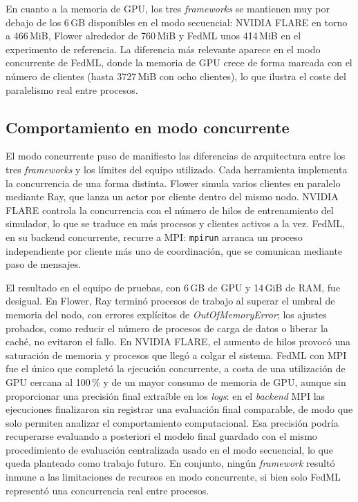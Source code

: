 En cuanto a la memoria de GPU, los tres \textit{frameworks} se mantienen muy por debajo de los
6\,GB disponibles en el modo secuencial: NVIDIA FLARE en torno a 466\,MiB, Flower alrededor de
760\,MiB y FedML unos 414\,MiB en el experimento de referencia. La diferencia más relevante
aparece en el modo concurrente de FedML, donde la memoria de GPU crece de forma marcada con el
número de clientes (hasta 3727\,MiB con ocho clientes), lo que ilustra el coste del paralelismo
real entre procesos.

\subsection{Comportamiento en modo concurrente}\label{sec:concurrencia}

El modo concurrente puso de manifiesto las diferencias de arquitectura entre los tres
\textit{frameworks} y los límites del equipo utilizado. Cada herramienta implementa la
concurrencia de una forma distinta. Flower simula varios clientes en paralelo mediante Ray, que
lanza un actor por cliente dentro del mismo nodo. NVIDIA FLARE controla la concurrencia con el
número de hilos de entrenamiento del simulador, lo que se traduce en más procesos y clientes
activos a la vez. FedML, en su backend concurrente, recurre a MPI: \texttt{mpirun} arranca un
proceso independiente por cliente más uno de coordinación, que se comunican mediante paso de
mensajes.

El resultado en el equipo de pruebas, con 6\,GB de GPU y 14\,GiB de RAM, fue desigual. En Flower,
Ray terminó procesos de trabajo al superar el umbral de memoria del nodo, con errores explícitos
de \textit{OutOfMemoryError}; los ajustes probados, como reducir el número de procesos de carga
de datos o liberar la caché, no evitaron el fallo. En NVIDIA FLARE, el aumento de hilos provocó
una saturación de memoria y procesos que llegó a colgar el sistema. FedML con MPI fue el único
que completó la ejecución concurrente, a costa de una utilización de GPU cercana al 100\,\% y de
un mayor consumo de memoria de GPU, aunque sin proporcionar una precisión final extraíble en los
\textit{logs}: en el \textit{backend} MPI las ejecuciones finalizaron sin registrar una
evaluación final comparable, de modo que solo permiten analizar el comportamiento computacional.
Esa precisión podría recuperarse evaluando a posteriori el modelo final guardado con el mismo
procedimiento de evaluación centralizada usado en el modo secuencial, lo que queda planteado como
trabajo futuro. En conjunto, ningún \textit{framework} resultó inmune a las limitaciones de
recursos en modo concurrente, si bien solo FedML representó una concurrencia real entre procesos.

